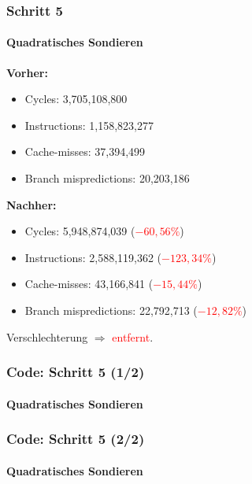 \documentclass{beamer}
\newcommand{\fail}[1]{\textcolor{red}{#1}}
\begin{document}
  \begin{frame}
  	\frametitle{Schritt 5}
  	\framesubtitle{Quadratisches Sondieren}
  	\textbf{Vorher:}
		\begin{itemize}
			\item Cycles: 3,705,108,800 \\
			\item Instructions: 1,158,823,277\\
			\item Cache-misses: 37,394,499\\
			\item Branch mispredictions: 20,203,186\\
		\end{itemize}

		\textbf{Nachher:}
		\begin{itemize}
			\item Cycles: 5,948,874,039 (\fail{$- 60,56 \%$})\\
			\item Instructions: 2,588,119,362 (\fail{$- 123,34 \%$})\\
			\item Cache-misses: 43,166,841 (\fail{$- 15,44 \%$})\\
			\item Branch mispredictions: 22,792,713 (\fail{$- 12,82 \%$})\\
		\end{itemize}
		Verschlechterung $\Rightarrow$ \fail{entfernt}.
  \end{frame}

  \begin{frame}
  	\frametitle{Code: Schritt 5 (1/2)}
  	\framesubtitle{Quadratisches Sondieren}
		\sQuadratOne
  \end{frame}

  \begin{frame}
  	\frametitle{Code: Schritt 5 (2/2)}
  	\framesubtitle{Quadratisches Sondieren}
		\sQuadratTwo
  \end{frame}
\end{document}
